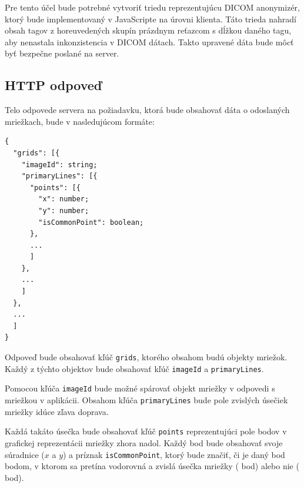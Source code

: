 Pre tento účel bude potrebné vytvoriť triedu reprezentujúcu DICOM anonymizér, ktorý bude implementovaný v JavaScripte na úrovni klienta. Táto trieda nahradí obsah tagov z horeuvedených skupín prázdnym reťazcom s dĺžkou daného tagu, aby nenastala inkonzistencia v DICOM dátach. Takto upravené dáta bude môcť byť bezpečne poslané na server.

\clearpage

\subsection{HTTP odpoveď}
Telo odpovede servera na požiadavku, ktorá bude obsahovať dáta o odoslaných mriežkach, bude v nasledujúcom formáte:

\begin{minipage}[]{\linewidth}
\begin{verbatim}
{
  "grids": [{
    "imageId": string;
    "primaryLines": [{
      "points": [{
        "x": number;
        "y": number;
        "isCommonPoint": boolean;
      },
      ...
      ]
    },
    ...
    ]
  },
  ...
  ]
}
\end{verbatim}
\end{minipage}

Odpoveď bude obsahovať kľúč \texttt{grids}, ktorého obsahom budú objekty mriežok. Každý z týchto objektov bude obsahovať kľúč \texttt{imageId} a \texttt{primaryLines}.

Pomocou kľúča \texttt{imageId} bude možné spárovať objekt mriežky v odpovedi s mriežkou v aplikácii. Obsahom kľúča \texttt{primaryLines} bude pole zvislých úsečiek mriežky idúce zľava doprava.

Každá takáto úsečka bude obsahovať kľúč \texttt{points} reprezentujúci pole bodov v grafickej reprezentácii mriežky zhora nadol. Každý bod bude obsahovať svoje súradnice ($x$ a $y$) a príznak \texttt{isCommonPoint}, ktorý bude značiť, či je daný bod bodom, v ktorom sa pretína vodorovná a zvislá úsečka mriežky ( bod) alebo nie ( bod).
